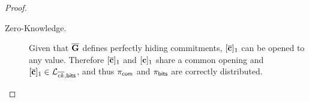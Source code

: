 \begin{proof}
\begin{description}
\item[Zero-Knowledge.] Given that $\overline{\mathbf{{G}}}$ defines perfectly hiding commitments, $[{\overline{\mathbf{c}}}]_1$ can be opened to any value. Therefore $[{\overline{\mathbf{c}}}]_1$ and $[\mathbf{c}]_1$ share a common opening and $[{\overline{\mathbf{c}}}]_1\in\mathcal{L}_{\overline{ck},\mathsf{bits}}$, and thus $\pi_{\mathsf{com}}$ and $\pi_{\mathsf{bits}}$ are correctly distributed.  
\end{description}
\end{proof}


